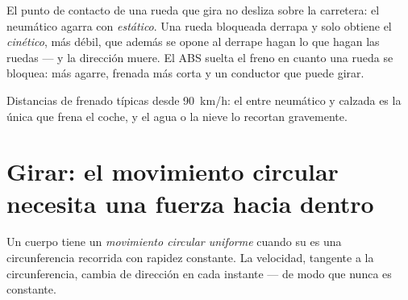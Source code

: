 \begin{remark}\label{rem:g11:forces-and-motion:abs}
El punto de contacto de una rueda que gira no desliza sobre la
carretera: el neumático agarra con  \emph{estático}. Una rueda
bloqueada derrapa y solo obtiene el  \emph{cinético}, más
débil, que además se opone al derrape hagan lo que hagan las ruedas ---
y la dirección muere. El ABS suelta el freno en cuanto una rueda se
bloquea: más agarre, frenada más corta y un conductor que puede girar.
\end{remark}

\begin{omfigure}

{\small Distancias de frenado típicas desde \qty{90}{km/h}: el
 entre neumático y calzada es la única  que frena el
coche, y el agua o la nieve lo recortan gravemente.}
\end{omfigure}

\section{Girar: el movimiento circular necesita una fuerza hacia dentro}

\begin{definition}\label{def:g11:forces-and-motion:ucm}
Un cuerpo tiene un \emph{movimiento circular
uniforme} cuando su  es
una circunferencia recorrida con rapidez constante. La velocidad,
tangente a la circunferencia, cambia de dirección en cada instante ---
de modo que nunca es constante.
\end{definition}

